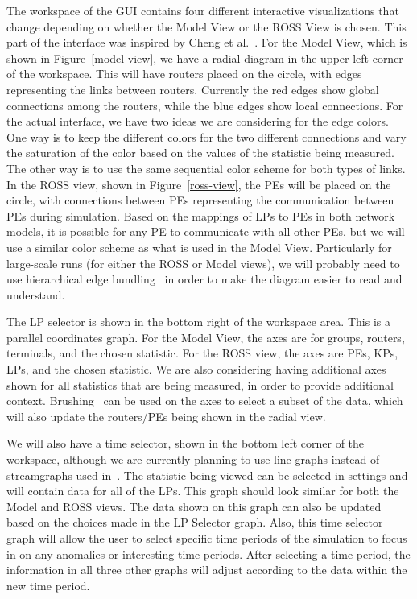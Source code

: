 \documentclass{acm_proc_article-sp}
\begin{document}
The workspace of the GUI contains four different interactive visualizations that change depending on whether the Model View or the ROSS View is chosen.  This part of the interface was inspired by Cheng et al.~\cite{cheng}. For the Model View, which is shown in Figure~\ref{model-view}, we have a radial diagram in the upper left corner of the workspace.  This will have routers placed on the circle, with edges representing the links between routers.  Currently the red edges show global connections among the routers, while the blue edges show local connections.  For the actual interface, we have two ideas we are considering for the edge colors.  One way is to keep the different colors for the two different connections and vary the saturation of the color based on the values of the statistic being measured.  The other way is to use the same sequential color scheme for both types of links.  In the ROSS view, shown in Figure~\ref{ross-view}, the PEs will be placed on the circle, with connections between PEs representing the communication between PEs during simulation.  Based on the mappings of LPs to PEs in both network models, it is possible for any PE to communicate with all other PEs, but we will use a similar color scheme as what is used in the Model View.  Particularly for large-scale runs (for either the ROSS or Model views), we will probably need to use hierarchical edge bundling~\cite{jia} in order to make the diagram easier to read and understand.  

The LP selector is shown in the bottom right of the workspace area.  This is a parallel coordinates graph.  For the Model View, the axes are for groups, routers, terminals, and the chosen statistic.  For the ROSS view, the axes are PEs, KPs, LPs, and the chosen statistic.  We are also considering having additional axes shown for all statistics that are being measured, in order to provide additional context.  Brushing~\cite{hauser} can be used on the axes to select a subset of the data, which will also update the routers/PEs being shown in the radial view.  

We will also have a time selector, shown in the bottom left corner of the workspace, although we are currently planning to use line graphs instead of streamgraphs used in~\cite{cheng}.  The statistic being viewed can be selected in settings and will contain data for all of the LPs.  This graph should look similar for both the Model and ROSS views.  The data shown on this graph can also be updated based on the choices made in the LP Selector graph. Also, this time selector graph will allow the user to select specific time periods of the simulation to focus in on any anomalies or interesting time periods. After selecting a time period, the information in all three other graphs will adjust according to the data within the new time period. 
\end{document}
